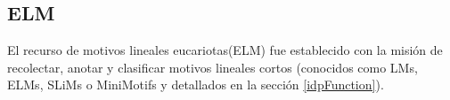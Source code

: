 































\subsection{ELM}\label{elm}

El recurso de motivos lineales eucariotas(ELM) \cite{puntervoll2003elm,dinkel2013eukaryotic} fue establecido con la misión de recolectar, anotar y clasificar motivos lineales cortos
(conocidos como LMs, ELMs, SLiMs o MiniMotifs y detallados en la sección \ref{idpFunction}). 

